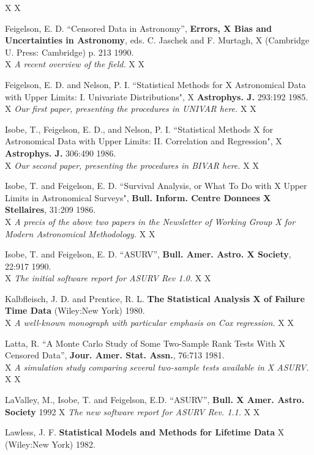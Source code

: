 \begin{description}
X
X\item [] Feigelson, E. D. ``Censored Data in Astronomy'', {\bf Errors,
X    Bias and Uncertainties in Astronomy}, eds. C. Jaschek and F. Murtagh,
X    (Cambridge U. Press: Cambridge) p. 213 1990.\\
X    {\it A recent overview of the field.}
X
X\item [] Feigelson, E. D. and Nelson, P. I. ``Statistical Methods for 
X    Astronomical Data with Upper Limits: I. Univariate Distributions", 
X    {\bf Astrophys. J.} 293:192 1985.\\
X    {\it Our first paper, presenting the procedures in UNIVAR here.}
X
X\item [] Isobe, T., Feigelson, E. D., and Nelson, P. I. ``Statistical Methods 
X    for Astronomical Data with Upper Limits: II. Correlation and Regression",
X    {\bf Astrophys. J.} 306:490 1986.\\
X    {\it Our second paper, presenting the procedures in BIVAR here.}
X
X\item [] Isobe, T. and Feigelson, E. D. ``Survival Analysis, or What To Do with
X    Upper Limits in Astronomical Surveys", {\bf Bull. Inform. Centre Donnees
X    Stellaires}, 31:209 1986.\\
X    {\it A precis of the above two papers in the Newsletter of Working Group 
X    for Modern Astronomical Methodology.}
X
X\item [] Isobe, T. and Feigelson, E. D. ``ASURV'', {\bf Bull. Amer. Astro.
X    Society}, 22:917 1990.\\
X    {\it The initial software report for ASURV Rev 1.0.}
X
X\item [] Kalbfleisch, J. D. and Prentice, R. L. {\bf The Statistical Analysis 
X    of Failure Time Data} (Wiley:New York) 1980.\\
X    {\it A well-known monograph with particular emphasis on Cox regression.}
X
X\item [] Latta, R. ``A Monte Carlo Study of Some Two-Sample Rank Tests With
X    Censored Data'', {\bf Jour. Amer. Stat. Assn.}, 76:713 1981. \\
X    {\it A simulation study comparing several two-sample tests available in
X    ASURV.}
X
X\item [] LaValley, M., Isobe, T. and Feigelson, E.D. ``ASURV'', {\bf Bull.
X    Amer. Astro. Society} 1992
X    {\it The new software report for ASURV Rev. 1.1.}
X
X\item [] Lawless, J. F. {\bf Statistical Models and Methods for Lifetime Data}
X    (Wiley:New York) 1982.\\

\end{description}
